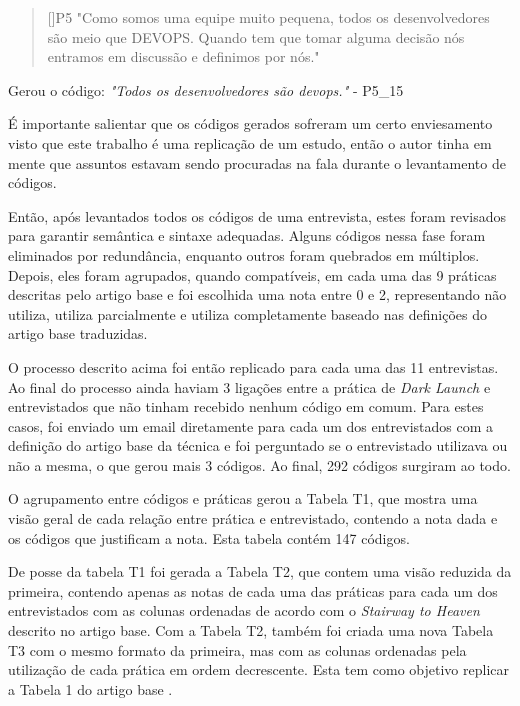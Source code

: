 \begin{quotation}[]{P5}
"Como somos uma equipe muito pequena, todos os desenvolvedores são meio que DEVOPS. Quando tem que tomar alguma decisão nós entramos em discussão e definimos por nós."
\end{quotation}

Gerou o código: \emph{"Todos os desenvolvedores são devops."} - P5\_15

É importante salientar que os códigos gerados sofreram um certo enviesamento visto que este trabalho é uma replicação de um estudo, então o autor tinha em mente que assuntos estavam sendo procuradas na fala durante o levantamento de códigos. 

Então, após levantados todos os códigos de uma entrevista, estes foram revisados para garantir semântica e sintaxe adequadas. Alguns códigos nessa fase foram eliminados por redundância, enquanto outros foram quebrados em múltiplos. Depois, eles foram agrupados, quando compatíveis, em cada uma das 9 práticas descritas pelo artigo base e foi escolhida uma nota entre 0 e 2, representando não utiliza, utiliza parcialmente e utiliza completamente baseado nas definições do artigo base traduzidas.

O processo descrito acima foi então replicado para cada uma das 11 entrevistas. Ao final do processo ainda haviam 3 ligações entre a prática de \emph{Dark Launch} e entrevistados que não tinham recebido nenhum código em comum. Para estes casos, foi enviado um email diretamente para cada um dos entrevistados com a definição do artigo base da técnica e foi perguntado se o entrevistado utilizava ou não a mesma, o que gerou mais 3 códigos. Ao final, 292 códigos surgiram ao todo.

O agrupamento entre códigos e práticas gerou a Tabela T1, que mostra uma visão geral de cada relação entre prática e entrevistado, contendo a nota dada e os códigos que justificam a nota. Esta tabela contém 147 códigos.




De posse da tabela T1 foi gerada a Tabela T2, que contem uma visão reduzida da primeira, contendo apenas as notas de cada uma das práticas para cada um dos entrevistados com as colunas ordenadas de acordo com o \emph{Stairway to Heaven} descrito no artigo base. Com a Tabela T2, também foi criada uma nova Tabela T3 com o mesmo formato da primeira, mas com as colunas ordenadas pela utilização de cada prática em ordem decrescente. Esta tem como objetivo replicar a Tabela 1 do artigo base \cite{empiricalStudy2016}.

